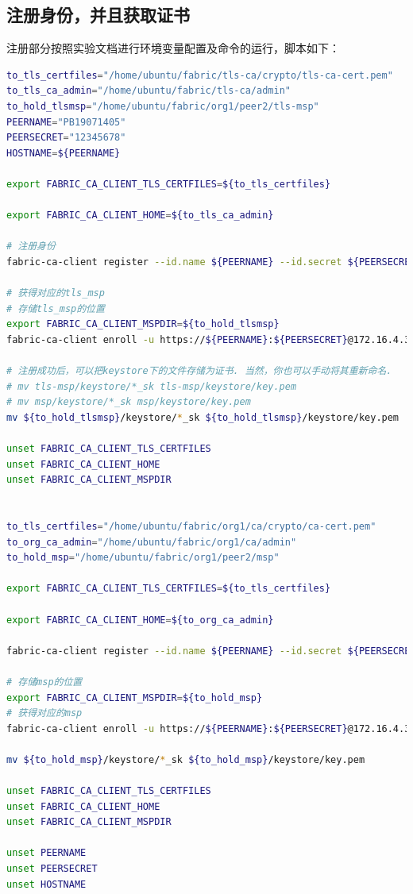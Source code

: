 \documentclass{article}
\begin{document}
    \subsection{注册身份，并且获取证书}
    注册部分按照实验文档进行环境变量配置及命令的运行，脚本如下：
    \begin{lstlisting}[language=bash]
to_tls_certfiles="/home/ubuntu/fabric/tls-ca/crypto/tls-ca-cert.pem"
to_tls_ca_admin="/home/ubuntu/fabric/tls-ca/admin"
to_hold_tlsmsp="/home/ubuntu/fabric/org1/peer2/tls-msp"
PEERNAME="PB19071405"
PEERSECRET="12345678"
HOSTNAME=${PEERNAME}

export FABRIC_CA_CLIENT_TLS_CERTFILES=${to_tls_certfiles}

export FABRIC_CA_CLIENT_HOME=${to_tls_ca_admin}

# 注册身份
fabric-ca-client register --id.name ${PEERNAME} --id.secret ${PEERSECRET} --id.type peer -u https://172.16.4.35:7052

# 获得对应的tls_msp
# 存储tls_msp的位置
export FABRIC_CA_CLIENT_MSPDIR=${to_hold_tlsmsp}
fabric-ca-client enroll -u https://${PEERNAME}:${PEERSECRET}@172.16.4.35:7052 --enrollment.profile tls --csr.hosts ${HOSTNAME}

# 注册成功后，可以把keystore下的文件存储为证书. 当然，你也可以手动将其重新命名.
# mv tls-msp/keystore/*_sk tls-msp/keystore/key.pem
# mv msp/keystore/*_sk msp/keystore/key.pem
mv ${to_hold_tlsmsp}/keystore/*_sk ${to_hold_tlsmsp}/keystore/key.pem

unset FABRIC_CA_CLIENT_TLS_CERTFILES
unset FABRIC_CA_CLIENT_HOME
unset FABRIC_CA_CLIENT_MSPDIR


to_tls_certfiles="/home/ubuntu/fabric/org1/ca/crypto/ca-cert.pem"
to_org_ca_admin="/home/ubuntu/fabric/org1/ca/admin"
to_hold_msp="/home/ubuntu/fabric/org1/peer2/msp"

export FABRIC_CA_CLIENT_TLS_CERTFILES=${to_tls_certfiles}

export FABRIC_CA_CLIENT_HOME=${to_org_ca_admin}

fabric-ca-client register --id.name ${PEERNAME} --id.secret ${PEERSECRET} --id.type peer -u https://172.16.4.35:7054 --csr.hosts ${HOSTNAME}

# 存储msp的位置
export FABRIC_CA_CLIENT_MSPDIR=${to_hold_msp}
# 获得对应的msp
fabric-ca-client enroll -u https://${PEERNAME}:${PEERSECRET}@172.16.4.35:7054

mv ${to_hold_msp}/keystore/*_sk ${to_hold_msp}/keystore/key.pem

unset FABRIC_CA_CLIENT_TLS_CERTFILES
unset FABRIC_CA_CLIENT_HOME
unset FABRIC_CA_CLIENT_MSPDIR

unset PEERNAME
unset PEERSECRET
unset HOSTNAME
    \end{lstlisting}
\end{document}
